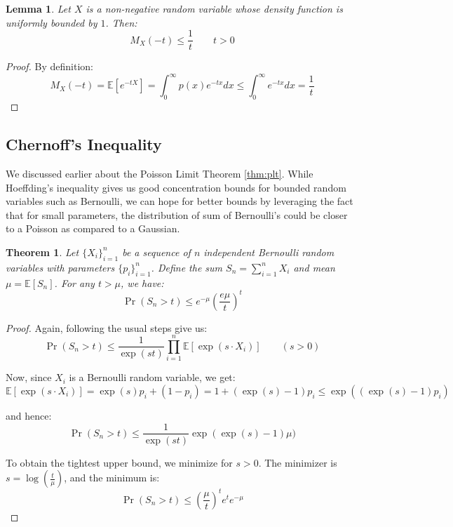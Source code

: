 \documentclass{article}
\newtheorem{theorem}{Theorem}[subsection]
\newtheorem{lemma}{Lemma}[subsection]
\theoremstyle{remark}
\newcommand{\Exp}{\mathbb{E}}
\begin{document}
\begin{lemma}
Let \(X\) is a non-negative random variable whose density function is uniformly bounded by \(1\). Then:
\begin{equation*}
M_{X}(-t) \leq \frac{1}{t} \qquad t > 0
\end{equation*}
\end{lemma}

\begin{proof}
By definition:
\begin{equation*}
M_{X}(-t) = \Exp[e^{-tX}] = \int_{0}^{\infty} p(x) e^{-tx} dx \leq \int_{0}^{\infty} e^{-tx} dx = \frac{1}{t}
\end{equation*}
\end{proof}

\subsection{Chernoff's Inequality}
We discussed earlier about the Poisson Limit Theorem \ref{thm:plt}. While Hoeffding's inequality gives us good concentration bounds for bounded random variables such as Bernoulli, we can hope for better bounds by leveraging the fact that for small parameters, the distribution of sum of Bernoulli's could be closer to a Poisson as compared to a Gaussian.

\begin{theorem}
\label{thm:chernoff}
Let \(\{X_{i}\}_{i=1}^{n}\) be a sequence of \(n\) independent Bernoulli random variables with parameters \(\{p_{i}\}_{i=1}^{n}\). Define the sum \(S_{n} = \sum\limits_{i=1}^{n} X_{i}\) and mean \(\mu = \Exp\left[S_{n}\right]\). For any \(t > \mu\), we have:
\begin{equation*}
\Pr(S_{n} > t) \leq e^{-\mu} \left(\frac{e\mu}{t}\right)^{t}
\end{equation*}
\end{theorem}

\begin{proof}
Again, following the usual steps give us:
\begin{equation*}
\Pr(S_{n} > t) \leq \frac{1}{\exp(st)}\prod_{i=1}^{n}\Exp\left[\exp(s \cdot X_{i})\right] \qquad (s > 0)
\end{equation*}

Now, since \(X_{i}\) is a Bernoulli random variable, we get:
\begin{equation*}
\Exp\left[\exp(s \cdot X_{i})\right] = \exp(s)p_{i} + (1 - p_{i}) = 1 + (\exp(s) - 1)p_{i} \leq \exp((\exp(s) - 1)p_{i})
\end{equation*}

and hence:
\begin{equation*}
\Pr(S_{n} > t) \leq \frac{1}{\exp(st)}\exp(\exp(s) - 1)\mu)
\end{equation*}

To obtain the tightest upper bound, we minimize for \(s > 0\). The minimizer is \(s = \log\left(\frac{t}{\mu}\right)\), and the minimum is:
\begin{equation*}
\Pr(S_{n} > t) \leq \left(\frac{\mu}{t}\right)^{t}e^{t}e^{-\mu}
\end{equation*}
\end{proof}
\end{document}
